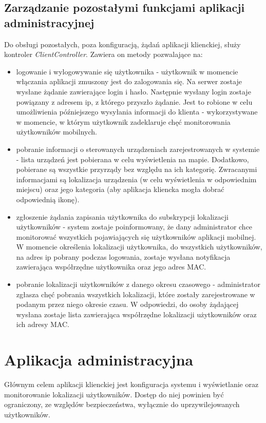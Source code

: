 \subsection{Zarządzanie pozostałymi funkcjami aplikacji administracyjnej}
Do obsługi pozostałych, poza konfiguracją, żądań aplikacji klienckiej, służy kontroler \textit{ClientController}. Zawiera on metody pozwalające na:
\begin{itemize}
	\item logowanie i wylogowywanie się użytkownika - użytkownik w momencie włączania aplikacji zmuszony jest do zalogowania się. Na serwer zostaje wysłane żądanie zawierające login i hasło. Następnie wysłany login zostaje powiązany z adresem ip, z którego przyszło żądanie. Jest to robione w celu umożliwienia późniejszego wysyłania informacji do klienta - wykorzystywane w momencie, w którym użytkownik zadeklaruje chęć monitorowania użytkowników mobilnych.
	\item pobranie informacji o sterowanych urządzeniach zarejestrowanych w systemie - lista urządzeń jest pobierana w celu wyświetlenia na mapie. Dodatkowo, pobierane są wszystkie przyrządy bez względu na ich kategorię. Zwracanymi informacjami są lokalizacja urządzenia (w celu wyświetlenia w odpowiednim miejscu) oraz jego kategoria (aby aplikacja kliencka mogła dobrać odpowiednią ikonę).
	\item zgłoszenie żądania zapisania użytkownika do subskrypcji lokalizacji użytkowników - system zostaje poinformowany, że dany administrator chce monitorować wszystkich pojawiających się użytkowników aplikacji mobilnej. W momencie określenia lokalizacji użytkownika, do wszystkich użytkowników, na adres ip pobrany podczas logowania, zostaje wysłana notyfikacja zawierająca współrzędne użytkownika oraz jego adres MAC.
	\item pobranie lokalizacji użytkowników z danego okresu czasowego - administrator zgłasza chęć pobrania wszystkich lokalizacji, które zostały zarejestrowane w podanym przez niego okresie czasu. W odpowiedzi, do osoby żądającej wysłana zostaje lista zawierająca współrzędne lokalizacji użytkowników oraz ich adresy MAC.
\end{itemize}	
\section{Aplikacja administracyjna}
Głównym celem aplikacji klienckiej jest konfiguracja systemu i wyświetlanie oraz monitorowanie lokalizacji użytkowników. Dostęp do niej powinien być ograniczony, ze względów bezpieczeństwa, wyłącznie do uprzywilejowanych użytkowników.
